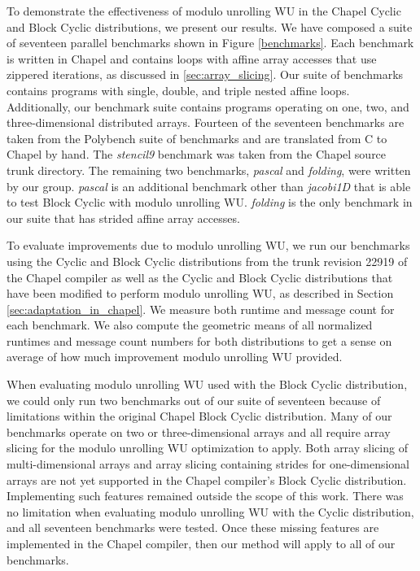 To demonstrate the effectiveness of modulo unrolling WU in the Chapel Cyclic and Block Cyclic distributions, we present our results. We have composed a suite of seventeen parallel benchmarks shown in Figure \ref{benchmarks}. Each benchmark is written in Chapel and contains loops with affine array accesses that use zippered iterations, as discussed in \ref{sec:array_slicing}. Our suite of benchmarks contains programs with single, double, and triple nested affine loops. Additionally, our benchmark suite contains programs operating on one, two, and three-dimensional distributed arrays. Fourteen of the seventeen benchmarks are taken from the Polybench suite of benchmarks \cite{polybench} and are translated from C to Chapel by hand. The \textit{stencil9} benchmark was taken from the Chapel source trunk directory. The remaining two benchmarks, \textit{pascal} and \textit{folding}, were written by our group. \textit{pascal} is an additional benchmark other than \textit{jacobi1D} that is able to test Block Cyclic with modulo unrolling WU. \textit{folding} is the only benchmark in our suite that has strided affine array accesses. 

To evaluate improvements due to modulo unrolling WU, we run our benchmarks using the Cyclic and Block Cyclic distributions from the trunk revision 22919 of the Chapel compiler as well as the Cyclic and Block Cyclic distributions that have been modified to perform modulo unrolling WU, as described in Section \ref{sec:adaptation_in_chapel}. We measure both runtime and message count for each benchmark. We also compute the geometric means of all normalized runtimes and message count numbers for both distributions to get a sense on average of how much improvement modulo unrolling WU provided. 

When evaluating modulo unrolling WU used with the Block Cyclic distribution, we could only run two benchmarks out of our suite of seventeen because of limitations within the original Chapel Block Cyclic distribution. Many of our benchmarks operate on two or three-dimensional arrays and all require array slicing for the modulo unrolling WU optimization to apply. Both array slicing of multi-dimensional arrays and array slicing containing strides for one-dimensional arrays are not yet supported in the Chapel compiler's Block Cyclic distribution. Implementing such features remained outside the scope of this work. There was no limitation when evaluating modulo unrolling WU with the Cyclic distribution, and all seventeen benchmarks were tested. Once these missing features are implemented in the Chapel compiler, then our method will apply to all of our benchmarks.

